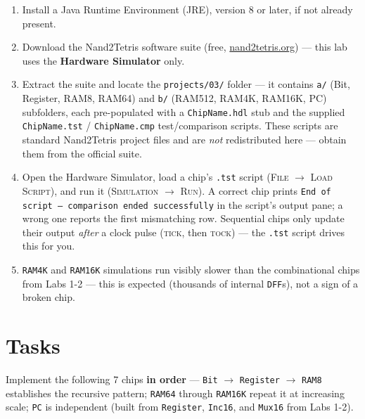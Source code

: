 \documentclass[11pt]{article}
\begin{document}
\begin{enumerate}
  \item Install a Java Runtime Environment (JRE), version 8 or later, if not already present.
  \item Download the Nand2Tetris software suite (free, \url{nand2tetris.org}) --- this lab uses the \textbf{Hardware Simulator} only.
  \item Extract the suite and locate the \texttt{projects/03/} folder --- it contains \texttt{a/} (Bit, Register, RAM8, RAM64) and \texttt{b/} (RAM512, RAM4K, RAM16K, PC) subfolders, each pre-populated with a \texttt{ChipName.hdl} stub and the supplied \texttt{ChipName.tst} / \texttt{ChipName.cmp} test/comparison scripts. These scripts are standard Nand2Tetris project files and are \emph{not} redistributed here --- obtain them from the official suite.
  \item Open the Hardware Simulator, load a chip's \texttt{.tst} script (\textsc{File} $\to$ \textsc{Load Script}), and run it (\textsc{Simulation} $\to$ \textsc{Run}). A correct chip prints \texttt{End of script --- comparison ended successfully} in the script's output pane; a wrong one reports the first mismatching row. Sequential chips only update their output \emph{after} a clock pulse (\textsc{tick}, then \textsc{tock}) --- the \texttt{.tst} script drives this for you.
  \item \texttt{RAM4K} and \texttt{RAM16K} simulations run visibly slower than the combinational chips from Labs 1-2 --- this is expected (thousands of internal \texttt{DFF}s), not a sign of a broken chip.
\end{enumerate}

\section{Tasks}
\label{sec:tasks}

Implement the following 7 chips \textbf{in order} --- \texttt{Bit} $\to$ \texttt{Register} $\to$ \texttt{RAM8} establishes the recursive pattern; \texttt{RAM64} through \texttt{RAM16K} repeat it at increasing scale; \texttt{PC} is independent (built from \texttt{Register}, \texttt{Inc16}, and \texttt{Mux16} from Labs 1-2).
\end{document}
